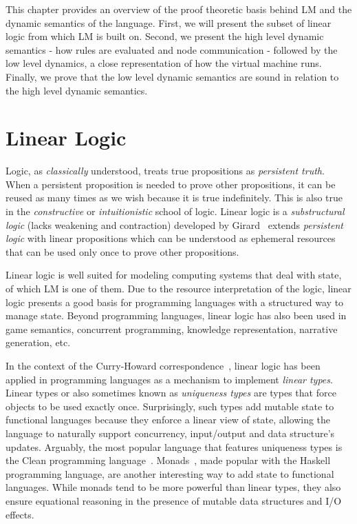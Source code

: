 This chapter provides an overview of the proof theoretic basis behind LM
and the dynamic semantics of the language. First, we will present the subset of
linear logic from which LM is built on. Second, we present the high level
dynamic semantics - how rules are evaluated and node communication - followed by
the low level dynamics, a close representation of how the virtual machine runs.
Finally, we prove that the low level dynamic semantics are sound in relation to
the high level dynamic semantics.

\section{Linear Logic}

Logic, as \emph{classically} understood, treats true propositions as
\emph{persistent truth}. When a persistent proposition is needed to prove other
propositions, it can be reused as many times as we wish because it is true
indefinitely. This is also true in the \emph{constructive} or
\emph{intuitionistic} school of logic.  Linear logic is a \emph{substructural
logic} (lacks weakening and contraction) developed by
Girard~\cite{Girard95logic:its} extends \emph{persistent logic} with linear
propositions which can be understood as ephemeral resources that can be used
only once to prove other propositions.

Linear logic is well suited for modeling computing systems that deal with state,
of which LM is one of them.  Due to the resource interpretation of the logic,
linear logic presents a good basis for programming languages with a structured
way to manage state. Beyond programming languages, linear logic has also been
used in game semantics, concurrent programming, knowledge representation,
narrative generation, etc.

In the context of the Curry-Howard correspondence~\cite{howard:tfatnoc}, linear
logic has been applied in programming languages as a mechanism to implement
\emph{linear types}. Linear types or also sometimes known as \emph{uniqueness
types} are types that force objects to be used exactly once. Surprisingly, such
types add mutable state to functional languages because they enforce a linear
view of state, allowing the language to naturally support concurrency,
input/output and data structure's updates.  Arguably, the most popular language
that features uniqueness types is the Clean programming
language~\cite{JFP:1349748}.  Monads~\cite{Wadler:1997:DI:262009.262011}, made
popular with the Haskell programming language, are another interesting way to
add state to functional languages. While monads tend to be more powerful than
linear types, they also ensure equational reasoning in the presence of mutable
data structures and I/O effects.

